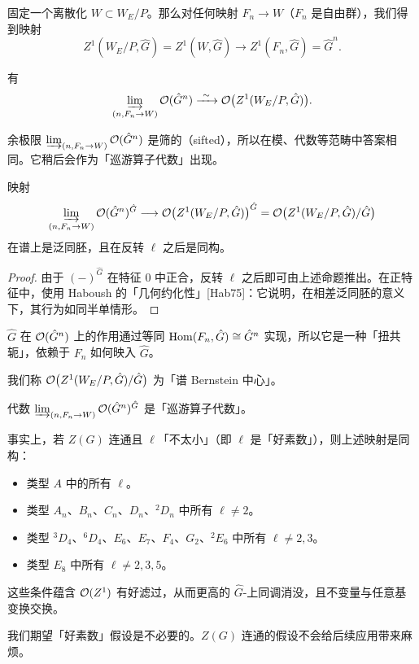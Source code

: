 固定一个离散化 $W\subset W_E/P$。那么对任何映射 $F_n\to W$（$F_n$ 是自由群），我们得到映射
\[
Z^1(W_E/P,\hat G)=Z^1(W,\hat G)\to Z^1(F_n,\hat G)=\hat G^n .
\]

\begin{proposition}
有
\[
\varinjlim_{(n,F_n\to W)}\mathcal{O}(\hat G^n)\xrightarrow{\ \sim\ }\mathcal{O}\bigl(Z^1(W_E/P,\hat G)\bigr).
\]
\end{proposition}

\begin{remark}
余极限 $\varinjlim_{(n,F_n\to W)}\mathcal{O}(\hat G^n)$ 是筛的（sifted），所以在模、代数等范畴中答案相同。它稍后会作为「巡游算子代数」出现。
\end{remark}

\begin{corollary}
映射
\[
\varinjlim_{(n,F_n\to W)}\mathcal{O}(\hat G^n)^{\hat G}\longrightarrow
\mathcal{O}\bigl(Z^1(W_E/P,\hat G)\bigr)^{\hat G}
=\mathcal{O}\bigl(Z^1(W_E/P,\hat G)/\hat G\bigr)
\]
在谱上是泛同胚，且在反转 $\ell$ 之后是同构。
\end{corollary}

\begin{proof}
由于 $(-)^{\hat G}$ 在特征 $0$ 中正合，反转 $\ell$ 之后即可由上述命题推出。在正特征中，使用 Haboush 的「几何约化性」[Hab75]：它说明，在相差泛同胚的意义下，其行为如同半单情形。
\end{proof}

\begin{remark}
$\hat G$ 在 $\mathcal{O}(\hat G^n)$ 上的作用通过等同 $\operatorname{Hom}(F_n,\hat G)\cong\hat G^n$ 实现，所以它是一种「扭共轭」，依赖于 $F_n$ 如何映入 $\hat G$。
\end{remark}


\begin{definition}
我们称 $\mathcal{O}\bigl(Z^1(W_E/P,\hat G)/\hat G\bigr)$ 为「谱 Bernstein 中心」。
\end{definition}

\begin{remark}
代数 $\varinjlim_{(n,F_n\to W)}\mathcal{O}(\hat G^n)^{\hat G}$ 是「巡游算子代数」。
\end{remark}

\begin{theorem}
事实上，若 $Z(G)$ 连通且 $\ell$「不太小」（即 $\ell$ 是「好素数」），则上述映射是同构：
\begin{itemize}
\item 类型 $A$ 中的所有 $\ell$。
\item 类型 $A_n$、$B_n$、$C_n$、$D_n$、${}^{2}D_n$ 中所有 $\ell\ne2$。
\item 类型 ${}^{3}D_4$、${}^{6}D_4$、$E_6$、$E_7$、$F_4$、$G_2$、${}^{2}E_6$ 中所有 $\ell\ne2,3$。
\item 类型 $E_8$ 中所有 $\ell\ne2,3,5$。
\end{itemize}
这些条件蕴含 $\mathcal{O}(Z^1)$ 有好滤过，从而更高的 $\hat G$-上同调消没，且不变量与任意基变换交换。
\end{theorem}

\begin{remark}
我们期望「好素数」假设是不必要的。$Z(G)$ 连通的假设不会给后续应用带来麻烦。
\end{remark}
